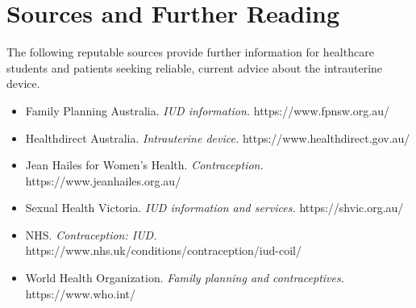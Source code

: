 \section*{Sources and Further Reading}
The following reputable sources provide further information for healthcare students and patients seeking reliable, current advice about the intrauterine device.
\begin{itemize}
    \item Family Planning Australia. \textit{IUD information.} https://www.fpnsw.org.au/
    \item Healthdirect Australia. \textit{Intrauterine device.} https://www.healthdirect.gov.au/
    \item Jean Hailes for Women's Health. \textit{Contraception.} https://www.jeanhailes.org.au/
    \item Sexual Health Victoria. \textit{IUD information and services.} https://shvic.org.au/
    \item NHS. \textit{Contraception: IUD.} https://www.nhs.uk/conditions/contraception/iud-coil/
    \item World Health Organization. \textit{Family planning and contraceptives.} https://www.who.int/
\end{itemize}
